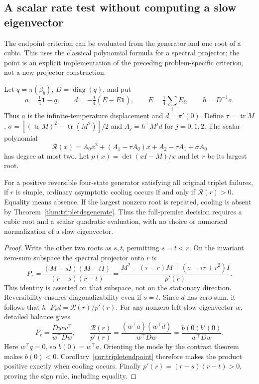\subsection{A scalar rate test without computing a slow eigenvector}
\label{sec:rateendpoint}
The endpoint criterion can be evaluated from the generator and one root
of a cubic. This uses the classical polynomial formula for a spectral
projector; the point is an explicit implementation of the preceding
problem-specific criterion, not a new projector construction.

Let $q=\pi(\beta_b)$, $D=\operatorname{diag}(q)$, and put
\[
a=\tfrac14\mathbf1-q,\qquad
d=-\tfrac14(E-\bar E\mathbf1),\qquad
\bar E=\tfrac14\sum_i E_i,\qquad h=D^{-1}a.
\]
Thus $a$ is the infinite-temperature displacement and $d=\pi'(0)$.
Define $\tau=\operatorname{tr}M$,
$\sigma=[(\operatorname{tr}M)^2-\operatorname{tr}(M^2)]/2$ and
$A_j=h^\top M^j d$ for $j=0,1,2$. The scalar polynomial
\[
\mathcal R(x)=A_0x^2+(A_1-\tau A_0)x
                  +A_2-\tau A_1+\sigma A_0
\]
has degree at most two. Let
$p(x)=\det(xI-M)/x$ and let $r$ be its largest root.

\begin{corollary}
\label{cor:rateendpoint}
For a positive reversible four-state generator satisfying all original
triplet failures, if $r$ is simple, ordinary asymptotic cooling occurs
if and only if $\mathcal R(r)>0$. Equality means absence.
If the largest nonzero root is repeated, cooling is absent by
Theorem~\ref{thm:tripletdegenerate}. Thus the full-premise decision
requires a cubic root and a scalar quadratic evaluation, with no
choice or numerical normalization of a slow eigenvector.
\end{corollary}
\begin{proof}
Write the other two roots as $s,t$, permitting $s=t<r$.
On the invariant zero-sum subspace the spectral projector onto $r$ is
\[
P_r=\frac{(M-sI)(M-tI)}{(r-s)(r-t)}
=\frac{M^2-(\tau-r)M+(\sigma-\tau r+r^2)I}{p'(r)}.
\]
This identity is asserted on that subspace, not on the stationary
direction. Reversibility ensures diagonalizability even if $s=t$.
Since $d$ has zero sum, it follows that
$h^\top P_r d=\mathcal R(r)/p'(r)$.
For any nonzero left slow eigenvector $w$, detailed balance gives
\[
P_r=\frac{Dw w^\top}{w^\top Dw},\qquad
\frac{\mathcal R(r)}{p'(r)}
=\frac{(w^\top a)(w^\top d)}{w^\top Dw}
=\frac{b(0)b'(0)}{w^\top Dw}.
\]
Here $w^\top q=0$, so $b(0)=w^\top a$. Orienting the mode by
the contrast theorem makes $b(0)<0$. Corollary~\ref{cor:tripletendpoint}
therefore makes the product positive exactly when cooling occurs.
Finally $p'(r)=(r-s)(r-t)>0$, proving the sign rule, including equality.
\end{proof}


